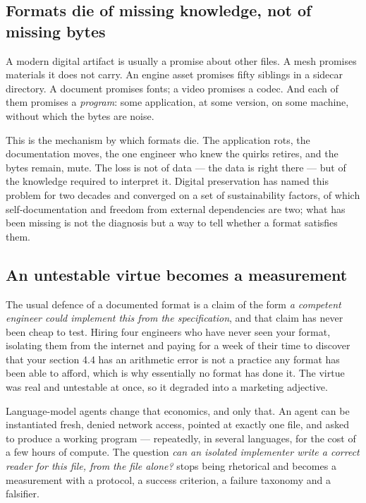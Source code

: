 \documentclass[10pt,twocolumn,letterpaper]{article}
\begin{document}
\subsection{Formats die of missing knowledge, not of missing bytes}

A modern digital artifact is usually a promise about other files. A mesh promises materials it does not carry. An engine asset promises fifty siblings in a sidecar directory. A document promises fonts; a video promises a codec. And each of them promises a \emph{program}: some application, at some version, on some machine, without which the bytes are noise.

This is the mechanism by which formats die. The application rots, the documentation moves, the one engineer who knew the quirks retires, and the bytes remain, mute. The loss is not of data --- the data is right there --- but of the knowledge required to interpret it. Digital preservation has named this problem for two decades and converged on a set of sustainability factors, of which self-documentation and freedom from external dependencies are two; what has been missing is not the diagnosis but a way to tell whether a format satisfies them.

\subsection{An untestable virtue becomes a measurement}

The usual defence of a documented format is a claim of the form \emph{a competent engineer could implement this from the specification}, and that claim has never been cheap to test. Hiring four engineers who have never seen your format, isolating them from the internet and paying for a week of their time to discover that your section 4.4 has an arithmetic error is not a practice any format has been able to afford, which is why essentially no format has done it. The virtue was real and untestable at once, so it degraded into a marketing adjective.

Language-model agents change that economics, and only that. An agent can be instantiated fresh, denied network access, pointed at exactly one file, and asked to produce a working program --- repeatedly, in several languages, for the cost of a few hours of compute. The question \emph{can an isolated implementer write a correct reader for this file, from the file alone?} stops being rhetorical and becomes a measurement with a protocol, a success criterion, a failure taxonomy and a falsifier.
\end{document}
